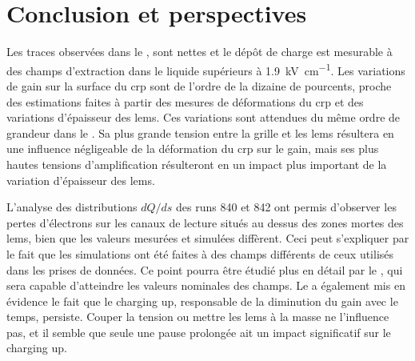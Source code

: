       \FloatBarrier

  \section{Conclusion et perspectives}

    Les traces observées dans le \TOO{}, sont nettes et le dépôt de charge est mesurable à des champs d'extraction dans le liquide supérieurs à \SI{1.9}{\kilo\volt\per\centi\meter}. Les variations de gain sur la surface du \gls{crp} sont de l'ordre de la dizaine de pourcents, proche des estimations faites à partir des mesures de déformations du \gls{crp} et des variations d'épaisseur des \glspl{lem}. Ces variations sont attendues du même ordre de grandeur dans le \SSS{}. Sa plus grande tension entre la grille et les \glspl{lem} résultera en une influence négligeable de la déformation du \gls{crp} sur le gain, mais ses plus hautes tensions d'amplification résulteront en un impact plus important de la variation d'épaisseur des \glspl{lem}.

    L'analyse des distributions $dQ/ds$ des runs 840 et 842 ont permis d'observer les pertes d'électrons sur les canaux de lecture situés au dessus des zones mortes des \glspl{lem}, bien que les valeurs mesurées et simulées diffèrent. Ceci peut s'expliquer par le fait que les simulations ont été faites à des champs différents de ceux utilisés dans les prises de données. Ce point pourra être étudié plus en détail par le \SSS{}, qui sera capable d'atteindre les valeurs nominales des champs. Le \TOO{} a également mis en évidence le fait que le charging up, responsable de la diminution du gain avec le temps, persiste. Couper la tension ou mettre les \glspl{lem} à la masse ne l'influence pas, et il semble que seule une pause prolongée ait un impact significatif sur le charging up.

\FloatBarrier

\printbibliography